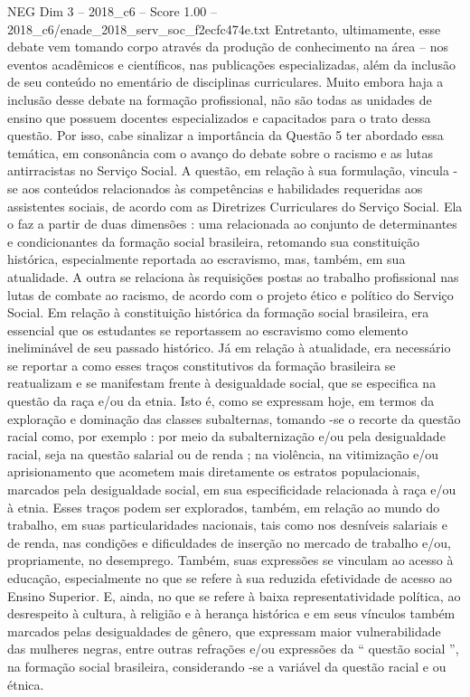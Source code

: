 \begin{textsample}{NEG Dim 3 – 2018\_c6 – Score 1.00 – 2018\_c6/enade\_2018\_serv\_soc\_f2ecfc474e.txt}
Entretanto, ultimamente, esse debate vem tomando corpo através da produção de conhecimento na área – nos eventos acadêmicos e científicos, nas publicações especializadas, além da inclusão de seu conteúdo no ementário de disciplinas curriculares.
Muito embora haja a inclusão desse debate na formação profissional, não são todas as unidades de ensino que possuem docentes especializados e capacitados para o trato dessa questão.
Por isso, cabe sinalizar a importância da Questão 5 ter abordado essa temática, em consonância com o avanço do debate sobre o racismo e as lutas antirracistas no Serviço Social.
A questão, em relação à sua formulação, vincula -se aos conteúdos relacionados às competências e habilidades requeridas aos assistentes sociais, de acordo com as Diretrizes Curriculares do Serviço Social.
Ela o faz a partir de duas dimensões : uma relacionada ao conjunto de determinantes e condicionantes da formação social brasileira, retomando sua constituição histórica, especialmente reportada ao escravismo, mas, também, em sua atualidade.
A outra se relaciona às requisições postas ao trabalho profissional nas lutas de combate ao racismo, de acordo com o projeto ético e político do Serviço Social.
Em relação à constituição histórica da formação social brasileira, era essencial que os estudantes se reportassem ao escravismo como elemento ineliminável de seu passado histórico.
Já em relação à atualidade, era necessário se reportar a como esses traços constitutivos da formação brasileira se reatualizam e se manifestam frente à desigualdade social, que se especifica na questão da raça e/ou da etnia.
Isto é, como se expressam hoje, em termos da exploração e dominação das classes subalternas, tomando -se o recorte da questão racial como, por exemplo : por meio da subalternização e/ou pela desigualdade racial, seja na questão salarial ou de renda ; na violência, na vitimização e/ou aprisionamento que acometem mais diretamente os estratos populacionais, marcados pela desigualdade social, em sua especificidade relacionada à raça e/ou à etnia.
Esses traços podem ser explorados, também, em relação ao mundo do trabalho, em suas particularidades nacionais, tais como nos desníveis salariais e de renda, nas condições e dificuldades de inserção no mercado de trabalho e/ou, propriamente, no desemprego.
Também, suas expressões se vinculam ao acesso à educação, especialmente no que se refere à sua reduzida efetividade de acesso ao Ensino Superior.
E, ainda, no que se refere à baixa representatividade política, ao desrespeito à cultura, à religião e à herança histórica e em seus vínculos também marcados pelas desigualdades de gênero, que expressam maior vulnerabilidade das mulheres negras, entre outras refrações e/ou expressões da “ questão social ”, na formação social brasileira, considerando -se a variável da questão racial e ou étnica.

\end{textsample}
